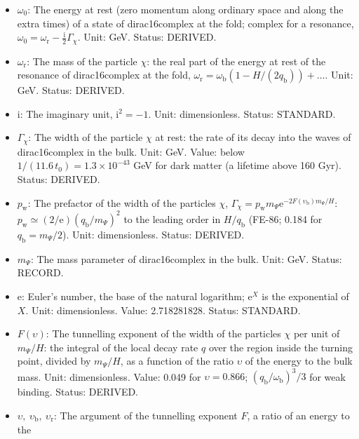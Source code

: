 \documentclass[
  10pt,
]{article}
\providecommand{\tightlist}{%
  \setlength{\itemsep}{0pt}\setlength{\parskip}{0pt}}
\begin{document}
\begin{itemize}
\tightlist
\item
  \(\omega_0\): The energy at rest (zero momentum along ordinary space
  and along the extra times) of a state of dirac16complex at the fold;
  complex for a resonance,
  \(\omega_0 = \omega_{\mathrm{r}} - \frac{\mathrm{i}}{2}\Gamma_\chi\).
  Unit: GeV. Status: DERIVED.
\item
  \(\omega_{\mathrm{r}}\): The mass of the particle \(\chi\): the real
  part of the energy at rest of the resonance of dirac16complex at the
  fold,
  \(\omega_{\mathrm{r}} = \omega_{\mathrm{b}}(1 - H/(2q_{\mathrm{b}})) + \dots\).
  Unit: GeV. Status: DERIVED.
\item
  \(\mathrm{i}\): The imaginary unit, \(\mathrm{i}^2 = -1\). Unit:
  dimensionless. Status: STANDARD.
\item
  \(\Gamma_\chi\): The width of the particle \(\chi\) at rest: the rate
  of its decay into the waves of dirac16complex in the bulk. Unit: GeV.
  Value: below \(1/(11.6\,t_0) = 1.3\times10^{-43}\) GeV for dark matter
  (a lifetime above 160 Gyr). Status: DERIVED.
\item
  \(p_{\mathrm{w}}\): The prefactor of the width of the particles
  \(\chi\),
  \(\Gamma_\chi = p_{\mathrm{w}}m_\Psi\mathrm{e}^{-2F(\upsilon_{\mathrm{b}})m_\Psi/H}\):
  \(p_{\mathrm{w}} \simeq (2/\mathrm{e})(q_{\mathrm{b}}/m_\Psi)^2\) to
  the leading order in \(H/q_{\mathrm{b}}\) (FE-86; 0.184 for
  \(q_{\mathrm{b}} = m_\Psi/2\)). Unit: dimensionless. Status: DERIVED.
\item
  \(m_\Psi\): The mass parameter of dirac16complex in the bulk. Unit:
  GeV. Status: RECORD.
\item
  \(\mathrm{e}\): Euler's number, the base of the natural logarithm;
  \(\mathrm{e}^{X}\) is the exponential of \(X\). Unit: dimensionless.
  Value: 2.718281828. Status: STANDARD.
\item
  \(F(\upsilon)\): The tunnelling exponent of the width of the particles
  \(\chi\) per unit of \(m_\Psi/H\): the integral of the local decay
  rate \(q\) over the region inside the turning point, divided by
  \(m_\Psi/H\), as a function of the ratio \(\upsilon\) of the energy to
  the bulk mass. Unit: dimensionless. Value: 0.049 for
  \(\upsilon = 0.866\); \((q_{\mathrm{b}}/\omega_{\mathrm{b}})^3/3\) for
  weak binding. Status: DERIVED.
\item
  \(\upsilon,\ \upsilon_{\mathrm{b}},\ \upsilon_{\mathrm{r}}\): The
  argument of the tunnelling exponent \(F\), a ratio of an energy to the

\end{itemize}
\end{document}

